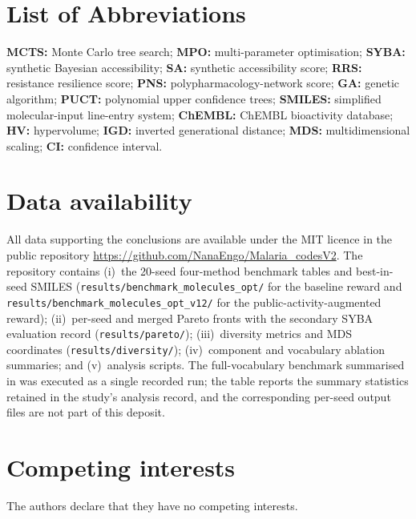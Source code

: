 \documentclass[10pt,a4paper]{article}
\begin{document}
\section*{List of Abbreviations}

\textbf{MCTS:} Monte Carlo tree search; \textbf{MPO:} multi-parameter optimisation; \textbf{SYBA:} synthetic Bayesian accessibility; \textbf{SA:} synthetic accessibility score; \textbf{RRS:} resistance resilience score; \textbf{PNS:} polypharmacology-network score; \textbf{GA:} genetic algorithm; \textbf{PUCT:} polynomial upper confidence trees; \textbf{SMILES:} simplified molecular-input line-entry system; \textbf{ChEMBL:} ChEMBL bioactivity database; \textbf{HV:} hypervolume; \textbf{IGD:} inverted generational distance; \textbf{MDS:} multidimensional scaling; \textbf{CI:} confidence interval.

\section*{Data availability}

All data supporting the conclusions are available under the MIT licence in the public repository \url{https://github.com/NanaEngo/Malaria_codesV2}. The repository contains (i)~the 20-seed four-method benchmark tables and best-in-seed SMILES (\texttt{results/benchmark\_molecules\_opt/} for the baseline reward and \texttt{results/benchmark\_molecules\_opt\_v12/} for the public-activity-augmented reward); (ii)~per-seed and merged Pareto fronts with the secondary SYBA evaluation record (\texttt{results/pareto/}); (iii)~diversity metrics and MDS coordinates (\texttt{results/diversity/}); (iv)~component and vocabulary ablation summaries; and (v)~analysis scripts. The full-vocabulary benchmark summarised in  was executed as a single recorded run; the table reports the summary statistics retained in the study's analysis record, and the corresponding per-seed output files are not part of this deposit.

\section*{Competing interests}
The authors declare that they have no competing interests.
\end{document}
